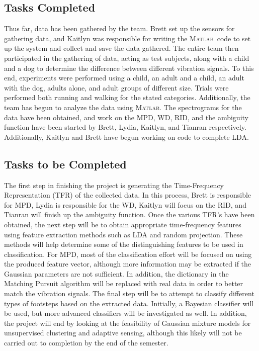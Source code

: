 \documentclass{article}[11pt]
\newcommand{\Matlab}{\textsc{Matlab}}
\begin{document}
\subsection{Tasks Completed}
\label{sec:completed}
Thus far, data has been gathered by the team. Brett set up the sensors for gathering data, and Kaitlyn was responsible for writing the \Matlab \ code to set up the system and collect and save the data gathered. The entire team then participated in the gathering of data, acting as test subjects, along with a child and a dog to determine the difference between different vibration signals. To this end, experiments were performed using a child, an adult and a child, an adult with the dog, adults alone, and adult groups of different size. Trials were performed both running and walking for the stated categories. Additionally, the team has begun to analyze the data using \Matlab. The spectrograms for the data have been obtained, and work on the MPD, WD, RID, and the ambiguity function have been started by Brett, Lydia, Kaitlyn, and Tianran respectively. Additionally, Kaitlyn and Brett have begun working on code to complete LDA.

\subsection{Tasks to be Completed}
\label{sec:future}
The first step in finishing the project is generating the Time-Frequency Representation (TFR) of the collected data. In this process, Brett is responsible for MPD, Lydia is responsible for the WD, Kaitlyn will focus on the RID, and Tianran will finish up the ambiguity function.
Once the various TFR's have been obtained, the next step will be to obtain appropriate time-frequency features using feature extraction methods such as LDA and random projection. These methods will help determine some of the distinguishing features to be used in classification. For MPD, most of the classification effort will be focused on using the produced feature vector, although more information may be extracted if the Gaussian parameters are not sufficient. In addition, the dictionary in the Matching Pursuit algorithm will be replaced with real data in order to better match the vibration signals. The final step will be to attempt to classify different types of footsteps based on the extracted data. Initially, a Bayesian classifier will be used, but more advanced classifiers will be investigated as well. In addition, the project will end by looking at the feasibility of Gaussian mixture models for unsupervised clustering and adaptive sensing, although this likely will not be carried out to completion by the end of the semester.




\end{document}
